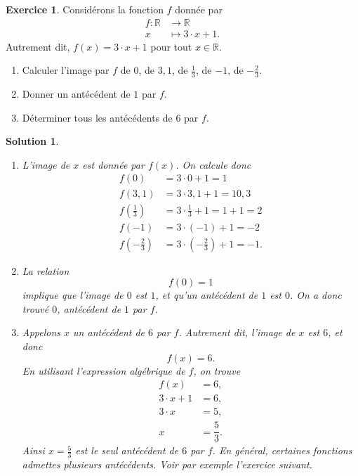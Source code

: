 \documentclass[a4paper, 14pt]{extarticle}
\theoremstyle{plain}
\newtheorem*{sol}{Solution}
\theoremstyle{definition}
\newtheorem{ex}{Exercice}
\newcommand{\R}{\mathbb{R}}
\newcommand{\exe}[2]{
		\begin{ex} #1  \end{ex}
		\begin{sol} #2 \end{sol}
	}
\newcommand{\exe}[2]{
		\begin{ex} #1  \end{ex}
	}
\begin{document}
	
	\exe{
		Considérons la fonction $f$ donnée par
		\begin{align*}
			f: \R & \longrightarrow \R \\
			x& \longmapsto 3\cdot x+1.
		\end{align*}
		Autrement dit, $f(x) = 3\cdot x + 1$ pour tout $x\in\R$.
		
		\begin{enumerate}
			\item
			Calculer l'image par $f$ de $0$, de $3,1$, de $\frac13$, de $-1$, de $-\frac23$.
			\item
			Donner un antécédent de $1$ par $f$.
			\item
			Déterminer tous les antécédents de $6$ par $f$.	
		\end{enumerate}
	}{
	
		\begin{enumerate}
		\item
		L'image de $x$ est donnée par $f(x)$. On calcule donc
			\begin{align*}
				f(0) &= 3\cdot0 + 1 = 1 \\
				f(3,1) &= 3\cdot3,1 + 1 = 10,3 \\
				f(\frac13) &= 3\cdot\frac13 + 1 = 1 + 1 = 2 \\
				f(-1) &= 3\cdot(-1) + 1 = -2 \\
				f(-\frac23) &= 3 \cdot (- \frac23) + 1 = -1.
			\end{align*}
		\item
		La relation
			\[ f(0) = 1 \]
		implique que l'image de $0$ est $1$, et qu'un antécédent de $1$ est $0$.
		On a donc trouvé $0$, antécédent de $1$ par $f$.
		\item
		Appelons $x$ un antécédent de $6$ par $f$.
		Autrement dit, l'image de $x$ est $6$, et donc 
			\[ f(x) = 6. \]
		En utilisant l'expression algébrique de $f$, on trouve
			\begin{align*}
				f(x) &= 6, \\
				3\cdot x + 1 &= 6, \\
				3\cdot x &= 5, \\
				x &= \dfrac53.
			\end{align*}
		Ainsi $x=\frac53$ est le seul antécédent de $6$ par $f$.
		En général, certaines fonctions admettes plusieurs antécédents.
		Voir par exemple l'exercice suivant.
		\end{enumerate}
	
	
	}
	
	
\end{document}

